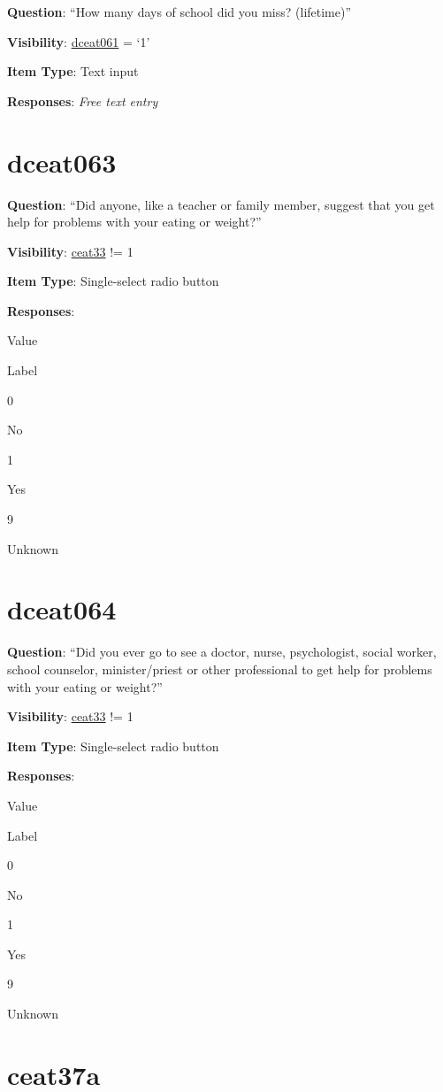 \documentclass[]{book}
\begin{document}
\textbf{Question}: ``How many days of school did you miss? (lifetime)''

\textbf{Visibility}: \protect\hyperlink{dceat061}{dceat061} = `1'

\textbf{Item Type}: Text input

\textbf{Responses}: \emph{Free text entry}

\hypertarget{dceat063}{%
\section{dceat063}\label{dceat063}}

\textbf{Question}: ``Did anyone, like a teacher or family member, suggest that you get help for problems with your eating or weight?''

\textbf{Visibility}: \protect\hyperlink{ceat33}{ceat33} != 1

\textbf{Item Type}: Single-select radio button

\textbf{Responses}:

Value

Label

0

No

1

Yes

9

Unknown

\hypertarget{dceat064}{%
\section{dceat064}\label{dceat064}}

\textbf{Question}: ``Did you ever go to see a doctor, nurse, psychologist, social worker, school counselor, minister/priest or other professional to get help for problems with your eating or weight?''

\textbf{Visibility}: \protect\hyperlink{ceat33}{ceat33} != 1

\textbf{Item Type}: Single-select radio button

\textbf{Responses}:

Value

Label

0

No

1

Yes

9

Unknown

\hypertarget{ceat37a}{%
\section{ceat37a}\label{ceat37a}}
\end{document}
